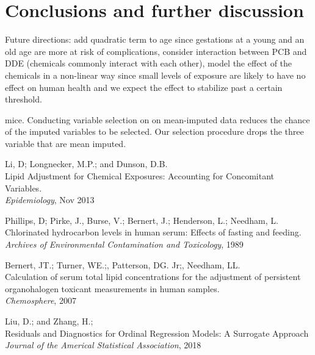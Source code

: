 \documentclass[10pt]{jmlr}%
\begin{document}
\section{Conclusions and further discussion}
\label{sec:conclusion}

Future directions: add quadratic term to age since gestations at a young and an old age are more at risk of complications, consider interaction between PCB and DDE (chemicals commonly interact with each other), model the effect of the chemicals in a non-linear way since small levels of exposure are likely to have no effect on human health and we expect the effect to stabilize past a certain threshold.

mice. Conducting variable selection on on mean-imputed data reduces the chance of the imputed variables to be selected. Our selection procedure drops the three variable that are mean imputed.


\newpage %
\begin{thebibliography}{99} %
	
	 Li, D; Longnecker, M.P.; and Dunson, D.B. \\
	\newblock Lipid Adjustment for Chemical Exposures: Accounting for Concomitant Variables.\\
	\newblock \emph{Epidemiology}, Nov 2013
	
	 Phillips, D; Pirke, J., Burse, V.; Bernert, J.; Henderson, L.; Needham, L.\\
	\newblock Chlorinated hydrocarbon levels in human serum: Effects of fasting and feeding.\\
	\newblock \emph{Archives of Environmental Contamination and Toxicology}, 1989
	
	 Bernert, JT.; Turner, WE.;, Patterson, DG. Jr;, Needham, LL.\\
	\newblock Calculation of serum total lipid concentrations for the adjustment of persistent organohalogen toxicant measurements in human samples.\\
	\newblock \emph{Chemosphere}, 2007
	
	 Liu, D.; and Zhang, H.;\\
	\newblock Residuals and Diagnostics for Ordinal Regression Models: A Surrogate Approach\\
	\newblock \emph{Journal of the Americal Statistical Association}, 2018
	
\end{thebibliography}
\end{document}
